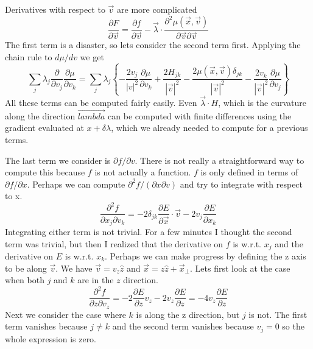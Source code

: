 \documentclass[a4paper]{article}
\begin{document}
Derivatives with respect to $\vec{v}$ are more complicated
\begin{equation}
\frac{\partial F}{\partial \vec{v}} = \frac{\partial f}{\partial \vec{v}} -
\vec{\lambda} \cdot \frac{\partial^2
\mu(\vec{x}, \vec{v})}{\partial \vec{v} \partial \vec{v}}
\end{equation}
The first term is a disaster, so lets consider the second term first.  Applying the chain rule
to $d\mu / dv$ we get
\begin{equation}
\sum_j \lambda_j \frac{\partial }{\partial v_j }
\frac{\partial \mu}{\partial v_k}
= 
\sum_j \lambda_j \left\{
-\frac{2 v_j}{|v|^2} \frac{\partial \mu}{\partial v_k}
+
\frac{ 2 H_{jk}}{|\vec{v}|^2}
-
\frac{2 \mu(\vec{x}, \vec{v}) \delta_{jk}}{|\vec{v}|^2}
-
\frac{2  v_k}{|\vec{v}|^2} \frac{\partial \mu}{\partial v_j}
\right\}
\end{equation}
All these terms can be computed fairly easily.  Even $\vec{\lambda} \cdot H$, which is the curvature along the direction $\vec{lambda}$ can be computed
with finite differences using the gradient evaluated at 
$x+\delta \lambda$, which we already needed to compute for a previous terms.

The last term we consider is $\partial f / \partial v$.  There is not really a
straightforward way to compute this because $f$ is not actually a function.
$f$ is only defined in terms of $\partial f / \partial x$.  Perhaps we can
compute $\partial^2 f / (\partial x \partial v)$ and try to integrate with
respect to x.
\begin{equation}
\frac{\partial^2 f}{\partial {x_j} \partial {v_k}} = 
- 2 \delta_{jk} \frac{\partial E}{\partial \vec{x}} \cdot \vec{v}
- 2 {v_j} \frac{\partial E}{\partial {x_k}}
\end{equation}
Integrating either term is not trivial.  For a few minutes I thought the second term was trivial, but then 
I realized that the derivative on $f$ is w.r.t. $x_j$ and the derivative on $E$ is w.r.t. $x_k$.
Perhaps we can make progress by defining the z axis to be along $\vec{v}$.  We have
$\vec{v} = v_z \hat{z}$ and $\vec{x} = z \hat{z} + \vec{x}_\perp$.
Lets first look at the case when both $j$ and $k$ are in the $z$ direction.
\begin{equation}
\frac{\partial^2 f}{\partial {z} \partial {v_z}} = 
- 2 \frac{\partial E}{\partial z} v_z
- 2 {v_z} \frac{\partial E}{\partial z}
=
- 4 {v_z} \frac{\partial E}{\partial z}
\end{equation}
Next we consider the case where $k$ is along the z direction, but $j$ is not.
The first term vanishes because $j \ne k$ and the second term vanishes because $v_j = 0$ so the whole
expression is zero.
\end{document}

